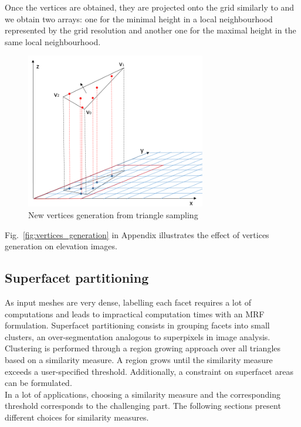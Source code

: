 \documentclass{kththesis}
\begin{document}
Once the vertices are obtained, they are projected onto the grid similarly to \parencite{det_seg_class} and we obtain two arrays: one for the minimal height in a local neighbourhood represented by the grid resolution and another one for the maximal height in the same local neighbourhood. 

\begin{figure}
    \centering
    \includegraphics[width=0.7\textwidth]{images/vertices_sampling.png}
    \caption{New vertices generation from triangle sampling}
    \label{fig:vertices}
\end{figure}
Fig.~\ref{fig:vertices_generation} in Appendix illustrates the effect of vertices generation on elevation images. 
\subsection{Superfacet partitioning}
As input meshes are very dense, labelling each facet requires a lot of computations and leads to impractical computation times with an MRF formulation. Superfacet partitioning \parencite{rouhani, verdie} consists in grouping facets into small clusters, an over-segmentation analogous to superpixels in image analysis. \\
Clustering is performed through a region growing approach over all triangles based on a similarity measure. A region grows until the similarity measure exceeds a user-specified threshold. Additionally, a constraint on superfacet areas can be formulated. \\
In a lot of applications, choosing a similarity measure and the corresponding threshold corresponds to the challenging part. The following sections present different choices for similarity measures.
\end{document}
